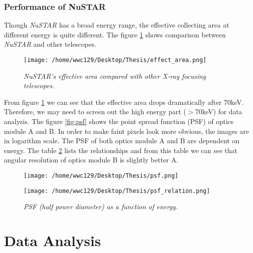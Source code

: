 \documentclass[12pt]{report}
\newcommand{\mycaption}[1]{\caption{\textit{\footnotesize #1}}}
\begin{document}
        \subsection{Performance of NuSTAR}
            Though \textit{NuSTAR} has a broad energy range, the effective collecting area at different energy is 
            quite different. The figure \ref{fig:effective_area} shows comparison between \textit{NuSTAR} and other 
            telescopes.
            \begin{figure}[h!]
              \centering
              \texttt{[image: /home/wwc129/Desktop/Thesis/effect\_area.png]}
              \mycaption{\textit{NuSTAR}'s effective area compared with other X-ray focusing telescopes.}
              \label{fig:effective_area}
            \end{figure}
            
            From figure \ref{fig:effective_area} we can see that the effective area drops dramatically after 70keV.
            Therefore, we may need to screen out the high energy part ($>$70keV) for data analysis.
            The figure \ref{fig:psf} shows the point spread function (PSF) of optics module A and B. In order to
            make faint pixels look more obvious, the images are in logarithm scale. The PSF of both optics module A
            and B are dependent on energy. The table \ref{table:psf_relation} lists the relationships and from this 
            table we can see that angular resolution of optics module B is slightly better A.
           
            \begin{figure}[h]
              \centering
              \texttt{[image: /home/wwc129/Desktop/Thesis/psf.png]}
              \mycaption{Image of NuSTAR's point spread function of optics module A(left) and B(right).}
              \label{fig:psf}
              \vspace{1cm} 
              \texttt{[image: /home/wwc129/Desktop/Thesis/psf\_relation.png]}
              \mycaption{PSF (half power diameter) as a function of energy.}
              \label{table:psf_relation}
            \end{figure}
           

\chapter{Data Analysis}
\end{document}
